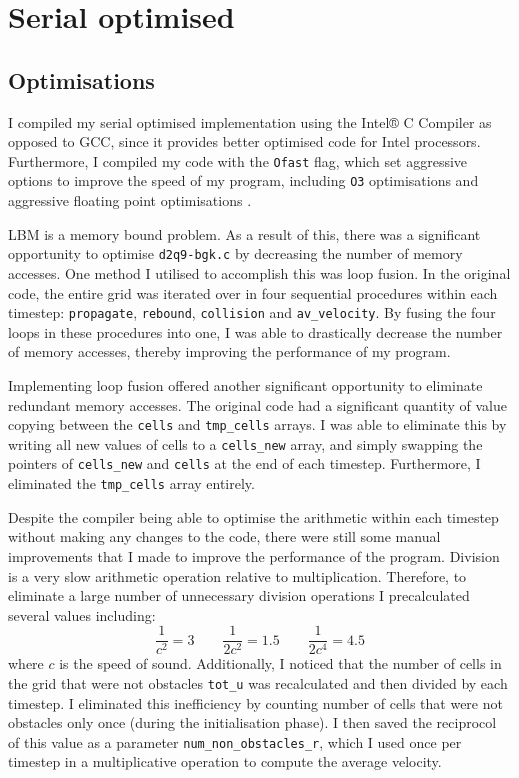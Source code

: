 \documentclass[11pt, twocolumn, a4paper]{article}
\begin{document}
\section{Serial optimised}

\subsection{Optimisations}

I compiled my serial optimised implementation using the Intel® C Compiler as opposed to GCC, since it provides better optimised code for Intel processors.
Furthermore, I compiled my code with the \texttt{Ofast} flag, which set aggressive options to improve the speed of my program, including \texttt{O3} optimisations and aggressive floating point optimisations \cite{icc}.

LBM is a memory bound problem.
As a result of this, there was a significant opportunity to optimise \texttt{d2q9-bgk.c} by decreasing the number of memory accesses.
One method I utilised to accomplish this was loop fusion.
In the original code, the entire grid was iterated over in four sequential procedures within each timestep: \texttt{propagate}, \texttt{rebound}, \texttt{collision} and \texttt{av\_velocity}.
By fusing the four loops in these procedures into one, I was able to drastically decrease the number of memory accesses, thereby improving the performance of my program.

Implementing loop fusion offered another significant opportunity to eliminate redundant memory accesses.
The original code had a significant quantity of value copying between the \texttt{cells} and \texttt{tmp\_cells} arrays.
I was able to eliminate this by writing all new values of cells to a \texttt{cells\_new} array, and simply swapping the pointers of \texttt{cells\_new} and \texttt{cells} at the end of each timestep.
Furthermore, I eliminated the \texttt{tmp\_cells} array entirely.

Despite the compiler being able to optimise the arithmetic within each timestep without making any changes to the code, there were still some manual improvements that I made to improve the performance of the program.
Division is a very slow arithmetic operation relative to multiplication.
Therefore, to eliminate a large number of unnecessary division operations I precalculated several values including:
\[
    \frac{1}{c^2} = 3\qquad
    \frac{1}{2c^2} = 1.5\qquad
    \frac{1}{2c^4} = 4.5
\]
where $c$ is the speed of sound.
Additionally, I noticed that the number of cells in the grid that were not obstacles \texttt{tot\_u} was recalculated and then divided by each timestep.
I eliminated this inefficiency by counting number of cells that were not obstacles only once (during the initialisation phase).
I then saved the reciprocol of this value as a parameter \texttt{num\_non\_obstacles\_r}, which I used once per timestep in a multiplicative operation to compute the average velocity.
\end{document}
